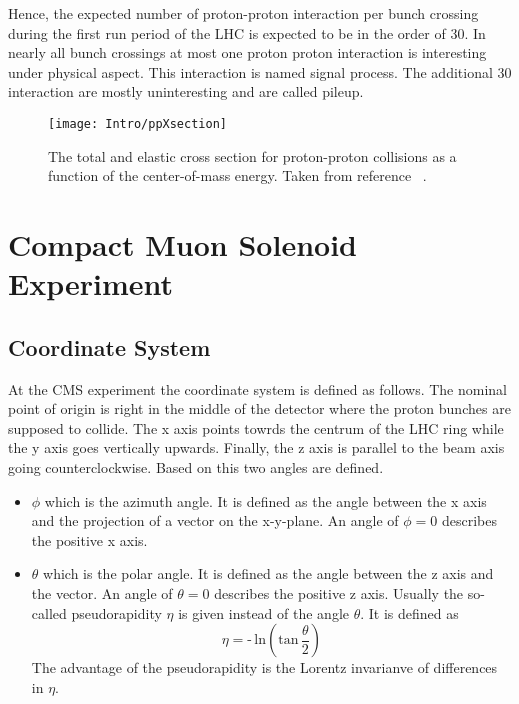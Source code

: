Hence, the expected number of proton-proton interaction per bunch crossing during the first run period of the LHC is expected to be in the order of 30. In nearly all bunch crossings at most one proton proton interaction is interesting under physical aspect. This interaction is named signal process. The additional 30 interaction are mostly uninteresting and are called pileup.

\begin{figure}[!Hhtb]
    \centering
    \texttt{[image: Intro/ppXsection]}
    \caption[Total and elastic cross section for pp interactions]{The total and elastic cross section for proton-proton collisions as a function of the center-of-mass energy. Taken from reference ~.\label{plot:IntroTotalCross}}
\end{figure}

\section{Compact Muon Solenoid Experiment \label{LHCCMSCMS}}

\subsection{Coordinate System \label{LCHCMSCoordSys}}

At the CMS experiment the coordinate system is defined as follows. The nominal point of origin is right in the middle of the detector where the proton bunches are supposed to collide. The x axis points towrds the centrum of the LHC ring while the y axis goes vertically upwards. Finally, the z axis is parallel to the beam axis going counterclockwise. Based on this two angles are defined.
\begin{itemize}
    \item{$\phi{}$} which is the azimuth angle. It is defined as the angle between the x axis and the projection of a vector on the x-y-plane. An angle of $\phi{} = 0$ describes the positive x axis.
    \item{$\theta{}$} which is the polar angle. It is defined as the angle between the z axis and the vector. An angle of $\theta{} = 0$ describes the positive z axis. Usually the so-called pseudorapidity $\eta{}$ is given instead of the angle $\theta$. It is defined as
    \begin{equation}
        \eta{} = \textrm{-}\,{}\textrm{ln} \left( \textrm{tan}\,{}\frac{\theta{}}{2}\right)
        \label{eq:pseudorapidity}
    \end{equation}
    The advantage of the pseudorapidity is the Lorentz invarianve of differences in $\eta{}$.
\end{itemize}

